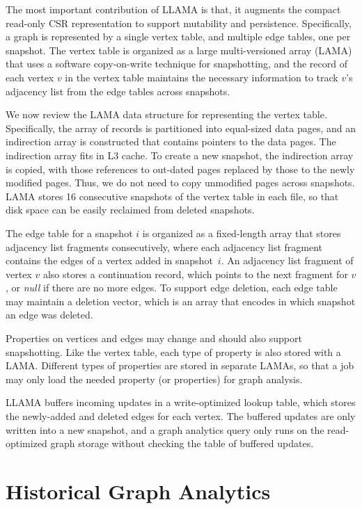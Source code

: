 \documentclass{svjour3}
\begin{document}
The most important contribution of LLAMA is that, it augments the compact read-only CSR representation to support mutability and persistence. Specifically, a graph is represented by a single vertex table, and multiple edge tables, one per snapshot. The vertex table is organized as a large multi-versioned array (LAMA) that uses a software copy-on-write technique for snapshotting, and the record of each vertex $v$ in the vertex table maintains the necessary information to track $v$'s adjacency list from the edge tables across snapshots.

We now review the LAMA data structure for representing the vertex table. Specifically, the array of records is partitioned into equal-sized data pages, and an indirection array is constructed that contains pointers to the data pages. The indirection array fits in L3 cache. To create a new snapshot, the indirection array is copied, with those references to out-dated pages replaced by those to the newly modified pages. Thus, we do not need to copy unmodified pages across snapshots. LAMA stores 16 consecutive snapshots of the vertex table in each file, so that disk space can be easily reclaimed from deleted snapshots.

The edge table for a snapshot $i$ is organized as a fixed-length array that stores adjacency list fragments consecutively, where each adjacency list fragment contains the edges of a vertex added in snapshot~$i$. An adjacency list fragment of vertex $v$ also stores a continuation record, which points to the next fragment for $v$, or {\em null} if there are no more edges. To support edge deletion, each edge table may maintain a deletion vector, which is an array that encodes in which snapshot an edge was deleted.

Properties on vertices and edges may change and should also support snapshotting. Like the vertex table, each type of property is also stored with a LAMA. Different types of properties are stored in separate LAMAs, so that a job may only load the needed property (or properties) for graph analysis.

LLAMA buffers incoming updates in a write-optimized lookup table, which stores the newly-added and deleted edges for each vertex. The buffered updates are only written into a new snapshot, and a graph analytics query only runs on the read-optimized graph storage without checking the table of buffered updates.





\section{Historical Graph Analytics}
\end{document}

